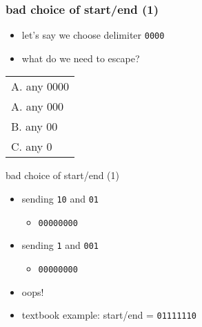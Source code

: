 \begin{frame}\frametitle{bad choice of start/end (1)}
    \begin{itemize}
    \item let's say we choose delimiter \texttt{0000}
    \item what do we need to escape?
    \end{itemize}
\begin{tabular}{l}
A. any 0000 \\
A. any 000 \\
B. any 00 \\
C. any 0 \\
\end{tabular}
\end{frame}

\begin{frame}{bad choice of start/end (1)}
    \begin{itemize}
    \item sending \texttt{10} and \texttt{01}
        \begin{itemize}
        \item {\tt {}00000000}
        \end{itemize}
    \item sending \texttt{1} and \texttt{001}
        \begin{itemize}
        \item {\tt {}00000000}
        \end{itemize}
    \vspace{.5cm}
    \item oops!
    \item textbook example: start/end = {\tt 01111110}
    \end{itemize}
\end{frame}

